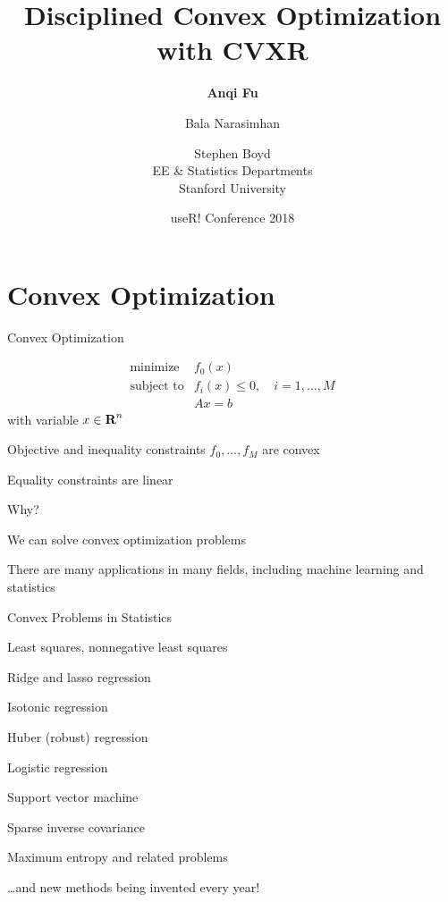 \documentclass{beamer}
\title{Disciplined Convex Optimization with CVXR}
\author{\textbf{Anqi Fu} \and Bala Narasimhan \and Stephen Boyd \\[2ex]
	EE \& Statistics Departments\\[1ex]
	Stanford University}
\date{useR! Conference 2018}
\begin{document}
	
\begin{frame}
	\titlepage
\end{frame}

\begin{frame}
	\tableofcontents
\end{frame}

\section{Convex Optimization}

\begin{frame}{Convex Optimization}%
	
	\[
	\begin{array}{ll} \mbox{minimize} & f_0(x)\\
	\mbox{subject to} & f_i(x) \leq 0, \quad i=1, \ldots, M\\
	& Ax=b
	\end{array}
	\]
	with variable $x \in {\mbox{\bf R}}^n$
	
	\BIT
		\item Objective and inequality constraints $f_0, \ldots, f_M$ are convex %
		\item Equality constraints are linear
	\EIT
	\pause
	
	\vfill
	Why?
	\BIT
		\item We can solve convex optimization problems
		\item There are many applications in many fields, including machine learning and statistics
	\EIT
	
\end{frame}

\begin{frame}{Convex Problems in Statistics}
	\BIT
		\item Least squares, nonnegative least squares
		\item Ridge and lasso regression
		\item Isotonic regression
		\item Huber (robust) regression
		\item Logistic regression
		\item Support vector machine
		\item Sparse inverse covariance
		\item Maximum entropy and related problems
		\item \ldots and new methods being invented every year!
	\EIT
\end{frame}
\end{document}
